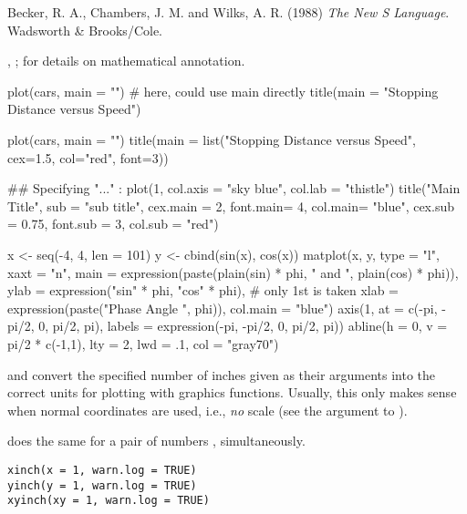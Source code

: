 %
\begin{References}\relax
Becker, R. A., Chambers, J. M. and Wilks, A. R. (1988)
\emph{The New S Language}.
Wadsworth \& Brooks/Cole.
\end{References}
%
\begin{SeeAlso}\relax
{}, ;
 for details on mathematical annotation.
\end{SeeAlso}
%
\begin{Examples}
\begin{ExampleCode}
plot(cars, main = "") # here, could use main directly
title(main = "Stopping Distance versus Speed")

plot(cars, main = "")
title(main = list("Stopping Distance versus Speed", cex=1.5,
                  col="red", font=3))

## Specifying "..." :
plot(1, col.axis = "sky blue", col.lab = "thistle")
title("Main Title", sub = "sub title",
      cex.main = 2,   font.main= 4, col.main= "blue",
      cex.sub = 0.75, font.sub = 3, col.sub = "red")


x <- seq(-4, 4, len = 101)
y <- cbind(sin(x), cos(x))
matplot(x, y, type = "l", xaxt = "n",
        main = expression(paste(plain(sin) * phi, "  and  ",
                                plain(cos) * phi)),
        ylab = expression("sin" * phi, "cos" * phi), # only 1st is taken
        xlab = expression(paste("Phase Angle ", phi)),
        col.main = "blue")
axis(1, at = c(-pi, -pi/2, 0, pi/2, pi),
     labels = expression(-pi, -pi/2, 0, pi/2, pi))
abline(h = 0, v = pi/2 * c(-1,1), lty = 2, lwd = .1, col = "gray70")
\end{ExampleCode}
\end{Examples}
%
\begin{Description}\relax
{} and  convert the specified number of inches
given as their arguments into the correct units for plotting with
graphics functions.  Usually, this only makes sense when normal
coordinates are used, i.e., \emph{no}  scale (see the
 argument to ).

 does the same for a pair of numbers ,
simultaneously.
\end{Description}
%
\begin{Usage}
\begin{verbatim}
xinch(x = 1, warn.log = TRUE)
yinch(y = 1, warn.log = TRUE)
xyinch(xy = 1, warn.log = TRUE)
\end{verbatim}
\end{Usage}
